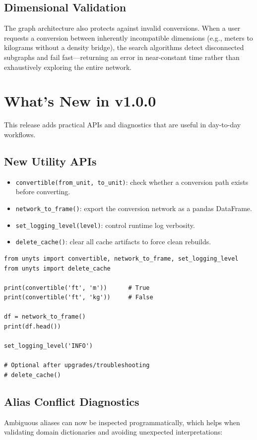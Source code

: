 \documentclass[11pt,a4paper]{report}
\begin{document}
\subsection{Dimensional Validation}
The graph architecture also protects against invalid conversions. When a user requests a conversion between inherently incompatible dimensions (e.g., meters to kilograms without a density bridge), the search algorithms detect disconnected subgraphs and fail fast---returning an error in near-constant time rather than exhaustively exploring the entire network.

\section{What's New in v1.0.0}

This release adds practical APIs and diagnostics that are useful in day-to-day workflows.

\subsection{New Utility APIs}
\begin{itemize}[leftmargin=*]
  \item \texttt{convertible(from\_unit, to\_unit)}: check whether a conversion path exists before converting.
  \item \texttt{network\_to\_frame()}: export the conversion network as a pandas DataFrame.
  \item \texttt{set\_logging\_level(level)}: control runtime log verbosity.
  \item \texttt{delete\_cache()}: clear all cache artifacts to force clean rebuilds.
\end{itemize}

\begin{lstlisting}[style=pythonstyle, caption={v1.0.0 utility functions}]
from unyts import convertible, network_to_frame, set_logging_level
from unyts import delete_cache

print(convertible('ft', 'm'))      # True
print(convertible('ft', 'kg'))     # False

df = network_to_frame()
print(df.head())

set_logging_level('INFO')

# Optional after upgrades/troubleshooting
# delete_cache()
\end{lstlisting}

\subsection{Alias Conflict Diagnostics}
Ambiguous aliases can now be inspected programmatically, which helps when validating domain dictionaries and avoiding unexpected interpretations:
\end{document}
